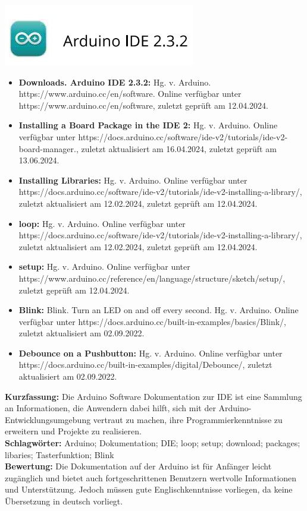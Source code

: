 {
	\includegraphics[width=0.38\linewidth]{images/IDE.jpg}
\begin{itemize}
	\item \textbf{Downloads. Arduino IDE 2.3.2:}
	Hg. v. Arduino. https://www.arduino.cc/en/software. Online verfügbar unter https://www.arduino.cc/en/software, zuletzt geprüft am 12.04.2024.
	\item \textbf{Installing a Board Package in the IDE 2:}
	Hg. v. Arduino. Online verfügbar unter https://docs.arduino.cc/software/ide-v2/tutorials/ide-v2-board-manager., zuletzt aktualisiert am 16.04.2024, zuletzt geprüft am 13.06.2024.
	\item \textbf{Installing Libraries:}
	Hg. v. Arduino. Online verfügbar unter https://docs.arduino.cc/software/ide-v2/tutorials/ide-v2-installing-a-library/, zuletzt aktualisiert am 12.02.2024, zuletzt geprüft am 12.04.2024.
	\item \textbf{loop:} Hg. v. Arduino. Online verfügbar unter https://docs.arduino.cc/software/ide-v2/tutorials/ide-v2-installing-a-library/, zuletzt aktualisiert am 12.02.2024, zuletzt geprüft am 12.04.2024.
	\item \textbf{setup:} Hg. v. Arduino. Online verfügbar unter https://www.arduino.cc/reference/en/language/structure/sketch/setup/, zuletzt geprüft am 12.04.2024.
	\item \textbf{Blink:} Blink. Turn an LED on and off every second. Hg. v. Arduino. Online verfügbar unter https://docs.arduino.cc/built-in-examples/basics/Blink/, zuletzt aktualisiert am 02.09.2022.	
	\item \textbf{Debounce on a Pushbutton:} Hg. v. Arduino. Online verfügbar unter https://docs.arduino.cc/built-in-examples/digital/Debounce/, zuletzt aktualisiert am	02.09.2022.
\end{itemize}
\textbf{Kurzfassung:}
Die Arduino Software Dokumentation zur IDE ist eine Sammlung an Informationen, die Anwendern dabei hilft, sich mit der Arduino-Entwicklungsumgebung vertraut zu machen, ihre Programmierkenntnisse zu erweitern und Projekte zu realisieren. 
\\ \textbf{Schlagwörter:}
Arduino; Dokumentation; DIE; loop; setup; download; packages; libaries; Tasterfunktion; Blink
\\ \textbf{Bewertung:}
Die Dokumentation auf der Arduino ist für Anfänger leicht zugänglich und bietet auch fortgeschrittenen Benutzern wertvolle Informationen und Unterstützung. Jedoch müssen gute Englischkenntnisse vorliegen, da keine Übersetzung in deutsch vorliegt.
}

